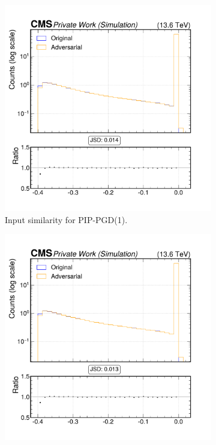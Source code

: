 \begin{figure}[h]
  \centering
  \begin{subfigure}[t]{0.32\textwidth}
    \includegraphics[width=\linewidth]{media/output/features/compare/combined_it_1/cmp_cpf_arr_Cpfcan_drminsv.pdf}
    \caption*{Input similarity for PIP-PGD(1).}
  \end{subfigure}\hfill
  \begin{subfigure}[t]{0.32\textwidth}
    \includegraphics[width=\linewidth]{media/output/features/compare/combined_it_2/cmp_cpf_arr_Cpfcan_drminsv.pdf}

\end{subfigure}
\end{figure}

